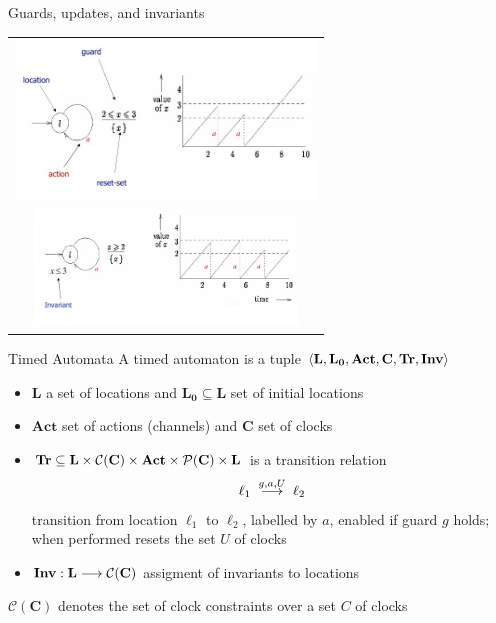 \documentclass{beamer}
\def\cc#1{\mathcal{C}(#1)}
\begin{document}
\begin{slide}{Guards, updates, and invariants}
\small \centering

\begin{tabular}{c}
   \includegraphics[width=8cm]{./images/model0.jpg} \\  \includegraphics[width=7cm]{./images/model1.jpg}
\end{tabular}

\end{slide}

\begin{slide}{Timed Automata}
\small
A timed automaton is a tuple
$\mathopen{\langle}\mathbf{L}, \mathbf{L_0}, \mathbf{Act}, \mathbf{C}, \mathbf{Tr}, 
\mathbf{Inv}\mathclose{\rangle}$ 
\begin{itemize}
     \item $\mathbf{L}$ a set of locations and 
             $\mathbf{L_0} \subseteq \mathbf{L}$ set
        of \alert{initial} locations
\item $\mathbf{Act}$ set of actions (\alert{channels}) 
        and $\mathbf{C}$ set of clocks
     \item
             $\mathbf{Tr} \subseteq \mathbf{L} 
             \times \cc{\mathbf{C}} \times \mathbf{Act} 
             \times \pow{(\mathbf{C})} \times \mathbf{L}$
     is a \alert{transition} relation
\begin{equation*}
  \ell_1\; \stackrel{g,a,U}{\longrightarrow}\;  \ell_2
\end{equation*}
transition from location $\ell_1$ to $\ell_2$, labelled by $a$, enabled if
\alert{guard} $g$ holds; when performed resets the set $U$ of clocks
\item $\fdec{\mathbf{Inv}}{\mathbf{L}}{\cc{\mathbf{C}}}$ assigment of invariants to
  locations
\end{itemize}
$\cc{\mathbf{C}}$ denotes the set of clock constraints over a set $C$ of
clocks
\end{slide}
\end{document}

